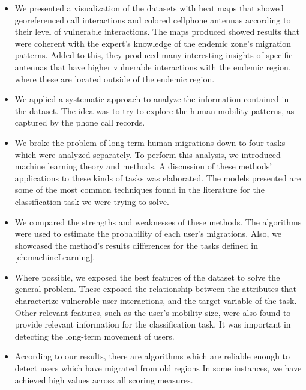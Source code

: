 \begin{itemize}

    \item We presented a visualization of the datasets with heat maps that showed georeferenced call interactions and colored cellphone antennas according to their level of vulnerable interactions.
    The maps produced showed results that were coherent with the expert's knowledge of the endemic zone's migration patterns.
    Added to this, they produced many interesting insights of specific antennas that have higher vulnerable interactions with the endemic region, where these are located outside of the endemic region.

    \item We applied a systematic approach to analyze the information contained in the dataset.
    The idea was to try to explore the human mobility patterns, as captured by the phone call records.

    \item We broke the problem of long-term human migrations down to four tasks which were analyzed separately.
    To perform this analysis, we introduced machine learning theory and methods.
    A discussion of these methods' applications to these kinds of tasks was elaborated.
    The models presented are some of the most common techniques found in the literature for the classification task we were trying to solve.

    \item We compared the strengths and weaknesses of these methods.
    The algorithms  were used to estimate the probability of each user's migrations.
    Also, we showcased the method's results differences for the tasks defined in \cref{ch:machineLearning}.

    \item Where possible, we exposed the best features of the dataset to solve the general problem.
    These exposed the relationship between the attributes that characterize vulnerable user interactions, and the target variable of the task.
    Other relevant features, such as the user's mobility size, were also found to provide relevant information for the classification task.
It was important in detecting the long-term movement of users.

    \item According to our results, there are algorithms which are reliable enough to detect users which have migrated from old regions
In some instances, we have achieved high values across all scoring measures.

\end{itemize}

